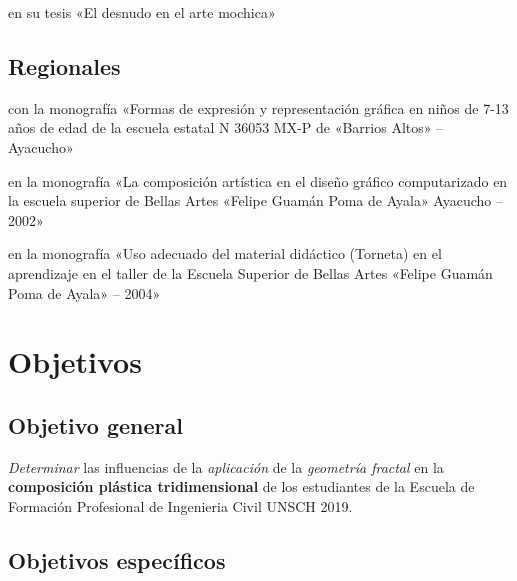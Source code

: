 \documentclass[12pt,]{report}
\begin{document}
\citep{nacional3} en su tesis «El desnudo en el arte mochica»

\hypertarget{regionales}{%
\subsection{Regionales}\label{regionales}}

\citep{regional1} con la monografía «Formas de expresión y representación
gráfica en niños de 7-13 años de edad de la escuela estatal N 36053 MX-P de «Barrios
Altos» -- Ayacucho»

\citep{regional2} en la monografía «La composición artística en el diseño
gráfico computarizado en la escuela superior de Bellas Artes «Felipe Guamán Poma de
Ayala» Ayacucho -- 2002»

\citep{regional3} en la monografía «Uso adecuado del material didáctico
(Torneta) en el aprendizaje en el taller de la Escuela Superior de Bellas Artes
«Felipe Guamán Poma de Ayala» -- 2004»

\hypertarget{objetivos}{%
\section{Objetivos}\label{objetivos}}

\hypertarget{objetivo-general}{%
\subsection{Objetivo general}\label{objetivo-general}}

\emph{Determinar} las influencias de la \emph{aplicación} de la \emph{geometría fractal} en la \textbf{composición
plástica tridimensional} de los estudiantes de la Escuela de Formación Profesional de
Ingenieria Civil UNSCH 2019.

\hypertarget{objetivos-especuxedficos}{%
\subsection{Objetivos específicos}\label{objetivos-especuxedficos}}
\end{document}
